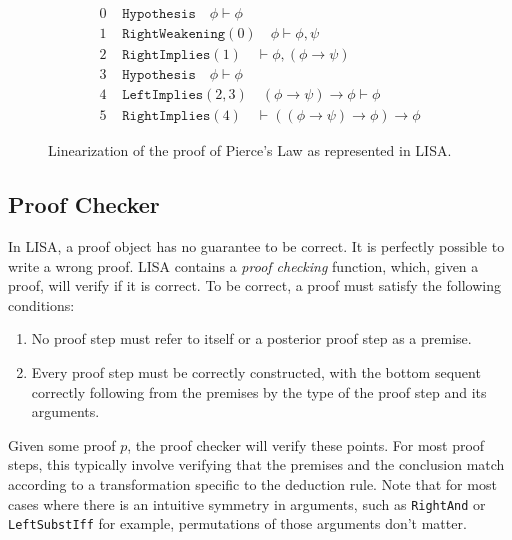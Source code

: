 \begin{figure}

  \begin{equation}
    \begin{split}
      0 &\texttt { Hypothesis} \quad \phi \vdash \phi\\
      1 &\texttt { RightWeakening}(0) \quad  \phi \vdash \phi, \psi\\
      2 &\texttt { RightImplies}(1) \quad  \vdash \phi, (\phi \to \psi)\\
      3 &\texttt { Hypothesis} \quad \phi \vdash \phi\\
      4 &\texttt { LeftImplies}(2,3) \quad (\phi \to \psi) \to \phi \vdash \phi\\
      5 &\texttt { RightImplies}(4) \quad \vdash ((\phi \to \psi) \to \phi) \to \phi
    \end{split}
  \end{equation}
  \caption{Linearization of the proof of Pierce's Law as represented in LISA.}
  \label{fig:exampleProofLinear}
\end{figure}

\subsection{Proof Checker}
\label{subs:proofchecker}

In LISA, a proof object has no guarantee to be correct. It is perfectly possible to write a wrong proof. LISA contains a \textit{proof checking} function, which, given a proof, will verify if it is correct. To be correct, a proof must satisfy the following conditions:
\begin{enumerate}
  \item No proof step must refer to itself or a posterior proof step as a premise.
  \item Every proof step must be correctly constructed, with the bottom sequent correctly following from the premises by the type of the proof step and its arguments.
\end{enumerate}


Given some proof $p$, the proof checker will verify these points. For most proof steps, this typically involve verifying that the premises and the conclusion match according to a transformation specific to the deduction rule. Note that for most cases where there is an intuitive symmetry in arguments, such as \texttt{RightAnd} or \texttt{LeftSubstIff} for example, permutations of those arguments don't matter.

